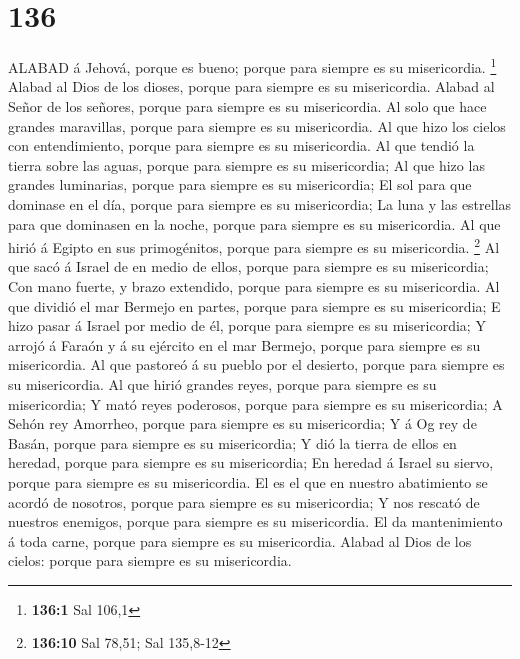 \hypertarget{section-135}{%
\section{136}\label{section-135}}

 ALABAD á Jehová, porque es bueno; porque para siempre es su
misericordia. \footnote{\textbf{136:1} Sal 106,1}  Alabad al
Dios de los dioses, porque para siempre es su misericordia. 
Alabad al Señor de los señores, porque para siempre es su misericordia.
 Al solo que hace grandes maravillas, porque para siempre es
su misericordia.  Al que hizo los cielos con entendimiento,
porque para siempre es su misericordia.  Al que tendió la
tierra sobre las aguas, porque para siempre es su misericordia;
 Al que hizo las grandes luminarias, porque para siempre es
su misericordia;  El sol para que dominase en el día, porque
para siempre es su misericordia;  La luna y las estrellas
para que dominasen en la noche, porque para siempre es su misericordia.
 Al que hirió á Egipto en sus primogénitos, porque para
siempre es su misericordia. \footnote{\textbf{136:10} Sal 78,51; Sal
  135,8-12}  Al que sacó á Israel de en medio de ellos,
porque para siempre es su misericordia;  Con mano fuerte, y
brazo extendido, porque para siempre es su misericordia. 
Al que dividió el mar Bermejo en partes, porque para siempre es su
misericordia;  E hizo pasar á Israel por medio de él,
porque para siempre es su misericordia;  Y arrojó á Faraón
y á su ejército en el mar Bermejo, porque para siempre es su
misericordia.  Al que pastoreó á su pueblo por el desierto,
porque para siempre es su misericordia.  Al que hirió
grandes reyes, porque para siempre es su misericordia;  Y
mató reyes poderosos, porque para siempre es su misericordia;
 A Sehón rey Amorrheo, porque para siempre es su
misericordia;  Y á Og rey de Basán, porque para siempre es
su misericordia;  Y dió la tierra de ellos en heredad,
porque para siempre es su misericordia;  En heredad á
Israel su siervo, porque para siempre es su misericordia. 
El es el que en nuestro abatimiento se acordó de nosotros, porque para
siempre es su misericordia;  Y nos rescató de nuestros
enemigos, porque para siempre es su misericordia.  El da
mantenimiento á toda carne, porque para siempre es su misericordia.
 Alabad al Dios de los cielos: porque para siempre es su
misericordia.

